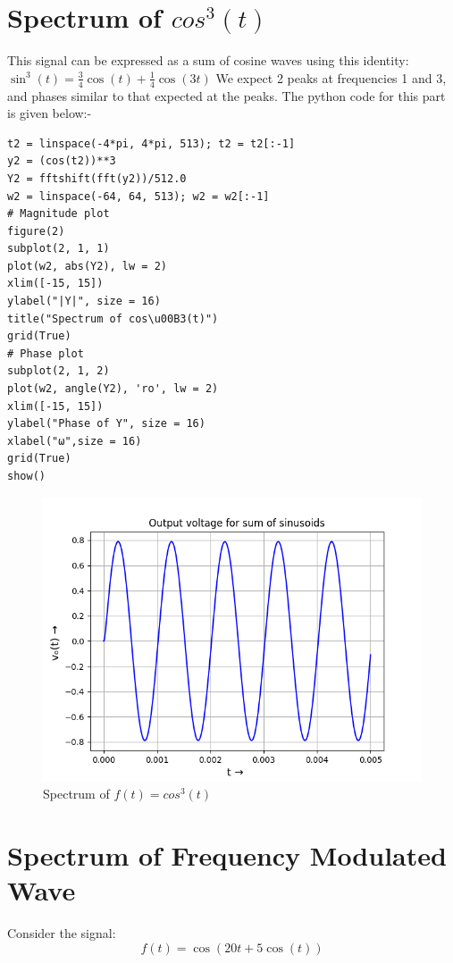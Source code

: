 \documentclass{article}
\begin{document}
\section{Spectrum of $cos^3(t)$}
This signal can be expressed as a sum of cosine waves using this identity:\newline
$\sin^3(t) = \frac{3}{4}\cos(t) + \frac{1}{4}\cos(3t)$\newline
We expect 2 peaks at frequencies 1 and 3, and phases similar to that expected at the peaks.
The python code for this part is given below:-
\begin{lstlisting}
t2 = linspace(-4*pi, 4*pi, 513); t2 = t2[:-1]
y2 = (cos(t2))**3
Y2 = fftshift(fft(y2))/512.0
w2 = linspace(-64, 64, 513); w2 = w2[:-1]
# Magnitude plot
figure(2)
subplot(2, 1, 1)
plot(w2, abs(Y2), lw = 2)
xlim([-15, 15])
ylabel("|Y|", size = 16)
title("Spectrum of cos\u00B3(t)")
grid(True)
# Phase plot
subplot(2, 1, 2)
plot(w2, angle(Y2), 'ro', lw = 2)
xlim([-15, 15])
ylabel("Phase of Y", size = 16)
xlabel("ω",size = 16)
grid(True)
show()
\end{lstlisting}
\begin{figure}[h!]
\centering
\includegraphics[scale=0.6]{Figure_2.png}
\caption{Spectrum of $f(t) = cos^3(t)$}
\label{fig:universe}
\end{figure}
\clearpage
\section{Spectrum of Frequency Modulated Wave}
Consider the signal:\newline
\begin{equation}
f(t) =  \cos(20t +5 \cos(t))    
\end{equation}
\end{document}
